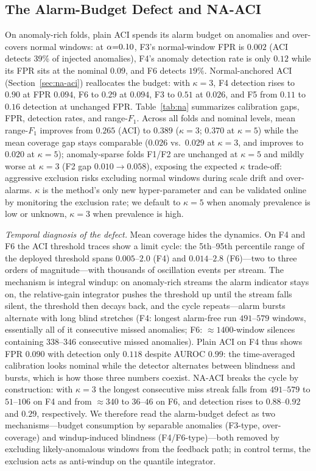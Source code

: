 \subsection{The Alarm-Budget Defect and NA-ACI}
\label{sec:na-aci-results}
On anomaly-rich folds, plain ACI spends its alarm budget on anomalies and over-covers normal windows: at $\alpha{=}0.10$, F3's normal-window FPR is $0.002$ (ACI detects 39\% of injected anomalies), F4's anomaly detection rate is only $0.12$ while its FPR sits at the nominal $0.09$, and F6 detects $19\%$. Normal-anchored ACI (Section~\ref{sec:na-aci}) reallocates the budget: with $\kappa{=}3$, F4 detection rises to $0.90$ at FPR $0.094$, F6 to $0.29$ at $0.094$, F3 to $0.51$ at $0.026$, and F5 from $0.11$ to $0.16$ detection at unchanged FPR. Table~\ref{tab:na} summarizes calibration gaps, FPR, detection rates, and range-$F_1$. Across all folds and nominal levels, mean range-$F_1$ improves from $0.265$ (ACI) to $0.389$ ($\kappa{=}3$; $0.370$ at $\kappa{=}5$) while the mean coverage gap stays comparable ($0.026$ vs.\ $0.029$ at $\kappa{=}3$, and improves to $0.020$ at $\kappa{=}5$); anomaly-sparse folds F1/F2 are unchanged at $\kappa{=}5$ and mildly worse at $\kappa{=}3$ (F2 gap $0.010\!\to\!0.058$), exposing the expected $\kappa$ trade-off: aggressive exclusion risks excluding normal windows during scale drift and over-alarms. $\kappa$ is the method's only new hyper-parameter and can be validated online by monitoring the exclusion rate; we default to $\kappa{=}5$ when anomaly prevalence is low or unknown, $\kappa{=}3$ when prevalence is high.

\emph{Temporal diagnosis of the defect.} Mean coverage hides the dynamics. On F4 and F6 the ACI threshold traces show a limit cycle: the 5th--95th percentile range of the deployed threshold spans $0.005$--$2.0$ (F4) and $0.014$--$2.8$ (F6)---two to three orders of magnitude---with thousands of oscillation events per stream. The mechanism is integral windup: on anomaly-rich streams the alarm indicator stays on, the relative-gain integrator pushes the threshold up until the stream falls silent, the threshold then decays back, and the cycle repeats---alarm bursts alternate with long blind stretches (F4: longest alarm-free run $491$--$579$ windows, essentially all of it consecutive missed anomalies; F6: $\approx 1400$-window silences containing $338$--$346$ consecutive missed anomalies). Plain ACI on F4 thus shows FPR $0.090$ with detection only $0.118$ despite AUROC $0.99$: the time-averaged calibration looks nominal while the detector alternates between blindness and bursts, which is how those three numbers coexist. NA-ACI breaks the cycle by construction: with $\kappa{=}3$ the longest consecutive miss streak falls from $491$--$579$ to $51$--$106$ on F4 and from $\approx 340$ to $36$--$46$ on F6, and detection rises to $0.88$--$0.92$ and $0.29$, respectively. We therefore read the alarm-budget defect as two mechanisms---budget consumption by separable anomalies (F3-type, over-coverage) and windup-induced blindness (F4/F6-type)---both removed by excluding likely-anomalous windows from the feedback path; in control terms, the exclusion acts as anti-windup on the quantile integrator.

